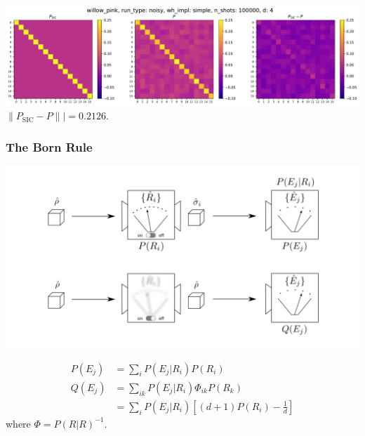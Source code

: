 \documentclass{beamer}
\begin{document}
\begin{frame}
\begin{center}
\includegraphics[scale=0.3]{img/P_noisy_simple_100000.pdf}	
 $\lVert P_{\text{SIC}}-P\rVert|=0.2126$.
\end{center}
	
\end{frame}


\begin{frame}
\frametitle{The Born Rule}
\vspace{-2em}
\begin{center}
\includegraphics[scale=0.45]{img/sky_ground}	
\end{center}
\vspace{-2em}
\begin{small}
\begin{align}
P(E_j) &= \sum_i P(E_j|R_i)P(R_i)\\
Q(E_j) &= \sum_{ik} P(E_j|R_i)\Phi_{ik}P(R_k)\\
&=\sum_{i} P(E_j|R_i)\left[(d+1)P(R_i)-\frac{1}{d}\right]
\end{align}
where $\Phi = P(R|R)^{-1}$.
\end{small}
\end{frame}
\end{document}

